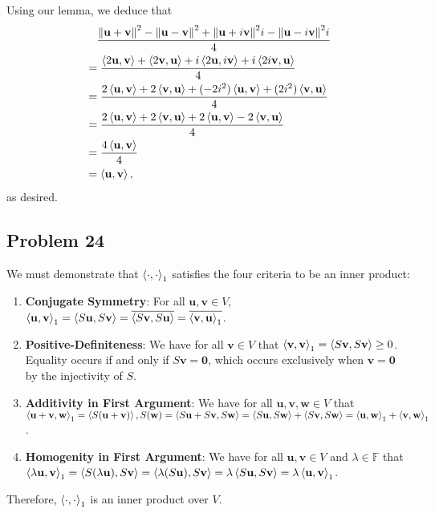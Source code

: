 \documentclass[11pt]{article}
\renewcommand{\vec}[1]{\mathbf{#1}}
\newcommand{\conjugate}[1]{\overline{#1}}
\begin{document}
Using our lemma, we deduce that
\begin{align*}
	& \quad \frac{\norm{\vec{u} + \vec{v}}^{2} - \norm{\vec{u} - \vec{v}}^{2} + \norm{\vec{u} + i \vec{v}}^{2} i - \norm{\vec{u} - i \vec{v}}^{2} i}{4} \\
		  &= \frac{\ev{2 \vec{u}, \vec{v}} + \ev{2 \vec{v}, \vec{u}} + i \ev{2 \vec{u}, i \vec{v}} + i \ev{2i \vec{v}, \vec{u}}}{4} \\
		  &= \frac{2 \ev{\vec{u}, \vec{v}} + 2 \ev{\vec{v}, \vec{u}} + (-2 i^{2}) \ev{\vec{u}, \vec{v}} + (2i^{2}) \ev{\vec{v}, \vec{u}}}{4} \\
		  &= \frac{2 \ev{\vec{u}, \vec{v}} + 2 \ev{\vec{v}, \vec{u}} + 2\ev{\vec{u}, \vec{v}} - 2 \ev{\vec{v}, \vec{u}}}{4} \\
		  &= \frac{4 \ev{\vec{u}, \vec{v}}}{4} \\
		  &= \ev{\vec{u}, \vec{v}},
\end{align*}
as desired.


\subsection{Problem 24}

We must demonstrate that $\ev{\cdot, \cdot}_{1}$ satisfies the four criteria to be an inner product:
\begin{enumerate}
	\item \textbf{Conjugate Symmetry}: For all $\vec{u}, \vec{v} \in V$, $\ev{\vec{u}, \vec{v}}_{1} = \ev{S \vec{u}, S \vec{v}} = \conjugate{\ev{S \vec{v}, S \vec{u}}} = \conjugate{\ev{\vec{v}, \vec{u}}_{1}}$.
	\item \textbf{Positive-Definiteness}: We have for all $\vec{v} \in V$ that $\ev{\vec{v}, \vec{v}}_{1} = \ev{S \vec{v}, S \vec{v}} \ge 0$. Equality occurs if and only if $S \vec{v} = \vec{0}$, which occurs exclusively when $\vec{v} = \vec{0}$ by the injectivity of $S$.
	\item \textbf{Additivity in First Argument}: We have for all $\vec{u}, \vec{v}, \vec{w} \in V$ that $\ev{\vec{u} + \vec{v}, \vec{w}}_{1} = \ev{S (\vec{u} + \vec{v})}, S(\vec{w}) = \ev{S \vec{u} + S \vec{v}, S \vec{w}} = \ev{S \vec{u}, S \vec{w}} + \ev{S \vec{v}, S \vec{w}} = \ev{\vec{u}, \vec{w}}_{1} + \ev{\vec{v}, \vec{w}}_{1}$.
	\item \textbf{Homogenity in First Argument}: We have for all $\vec{u}, \vec{v} \in V$ and $\lambda \in \mathbb{F}$ that $\ev{\lambda \vec{u}, \vec{v}}_{1} = \ev{S (\lambda \vec{u}), S \vec{v}} = \ev{\lambda (S \vec{u}), S \vec{v}} = \lambda \ev{S \vec{u}, S \vec{v}} = \lambda \ev{\vec{u}, \vec{v}}_{1}$.
\end{enumerate}
Therefore, $\ev{\cdot, \cdot}_{1}$ is an inner product over $V$.
\end{document}
